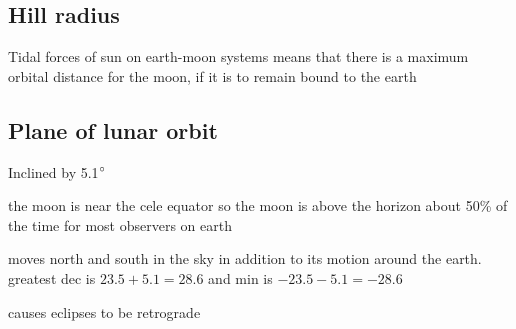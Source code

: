 \documentclass{article}
\begin{document}

\begin{center}
\end{center}


\subsection{Hill radius}
\begin{list}{-}{}
\item Tidal forces of sun on earth-moon systems means that there is a maximum orbital distance for the moon, if it is to remain bound to the earth
\end{list}

\subsection{Plane of lunar orbit}
\begin{list}{-}{}
\item Inclined by 5.1$\degree$
\item the moon is near the cele equator so the moon is above the horizon about 50\% of the time for most observers on earth
\item moves north and south in the sky in addition to its motion around the earth. greatest dec is $23.5+5.1 = 28.6$ and min is $-23.5 -5.1 = -28.6$ 
\item causes eclipses to be retrograde
\end{list}
\end{document}
